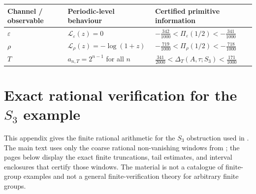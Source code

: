 \documentclass[11pt,a4paper]{amsart}
\theoremstyle{plain}
\theoremstyle{definition}
\theoremstyle{remark}
\begin{document}
\begin{center}
\footnotesize
\begin{tabular}{@{}p{}p{}p{}@{}}
\toprule
Channel / observable & Periodic-level behaviour & Certified primitive information \\
\midrule
\(\varepsilon\) &
\(\mathcal L_\varepsilon(z)=0\) &
\(-\frac{342}{1000}<\Pi_\varepsilon(1/2)<-\frac{341}{1000}\) \\
\(\rho\) &
\(\mathcal L_\rho(z)=-\log(1+z)\) &
\(-\frac{719}{1000}<\Pi_\rho(1/2)<-\frac{718}{1000}\) \\
\(T\) &
\(a_{n,T}=2^{n-1}\) for all \(n\) &
\(\frac{341}{2000}<\Delta_T(A,\tau;S_3)<\frac{171}{1000}\) \\
\bottomrule
\end{tabular}
\end{center}



\section[Exact rational verification for the S3 example]{Exact
  rational verification for the \texorpdfstring{$S_3$}{S3}
  example}
\label{app:s3-log-certificates}

This appendix gives the finite rational arithmetic for the \(S_3\) obstruction used in
.
The main text uses only the coarse rational non-vanishing windows from
; the pages below display the exact
finite truncations, tail estimates, and interval enclosures that certify those
windows.  The material is not a catalogue of finite-group examples and not a
general finite-verification theory for arbitrary finite groups.
\end{document}
